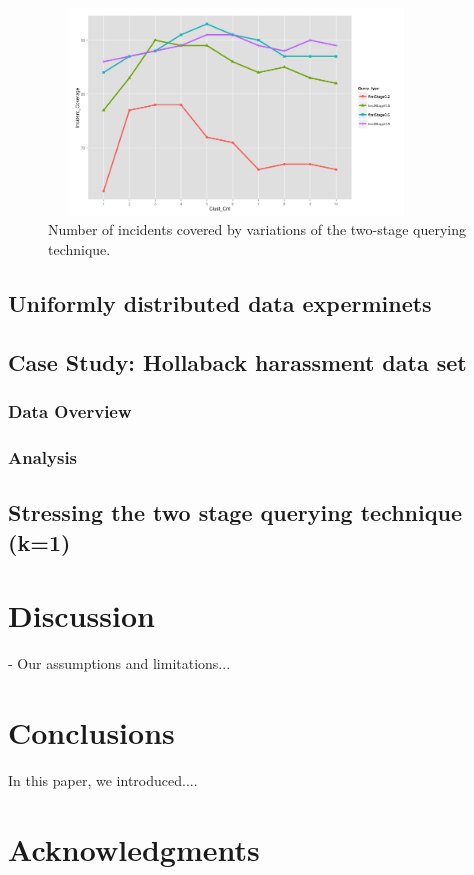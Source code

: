 \documentclass{acm_proc_article-sp}
\begin{document}
\begin{figure}[!htb]
\centering
   \includegraphics[width=10cm ,height=5.5cm]{figuresPng/Coverage_Result}
   \caption{Number of incidents covered by variations of the two-stage querying technique. }\label{fig: heatMap}
\end{figure}
\subsection{Uniformly distributed data experminets}
\subsection{Case Study: Hollaback harassment data set}
\subsubsection{Data Overview}
\subsubsection{Analysis}
\subsection{Stressing the two stage querying technique (k=1)}

\section{Discussion}
- Our assumptions and limitations...

\section{Conclusions}
In this paper, we introduced.... 

\section{Acknowledgments}


{\footnotesize
}  %
%
%
\end{document}
